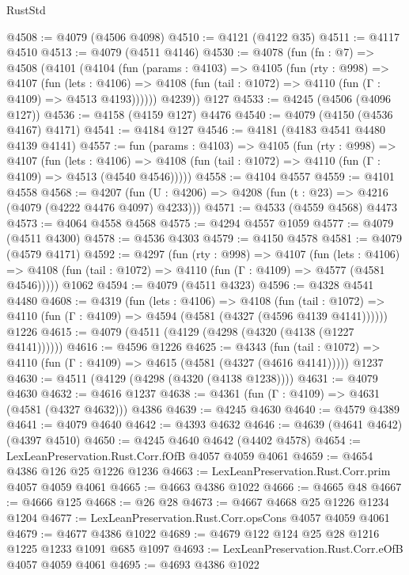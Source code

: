 \begin{lexlean}{RustStd}
\begin{coremodule}
@4508 := @4079 (@4506 @4098)
@4510 := @4121 (@4122 @35)
@4511 := @4117 @4510
@4513 := @4079 (@4511 @4146)
@4530 := @4078
    (fun (fn : @7) =>
    @4508
      (@4101
        (@4104
          (fun (params : @4103) =>
          @4105
            (fun (rty : @998) =>
            @4107
              (fun (lets : @4106) =>
              @4108 (fun (tail : @1072) => @4110 (fun (Γ : @4109) => @4513 @4193))))))
        @4239))
    @127
@4533 := @4245 (@4506 (@4096 @127))
@4536 := @4158 (@4159 @127) @4476
@4540 := @4079 (@4150 (@4536 @4167) @4171)
@4541 := @4184 @127
@4546 := @4181 (@4183 @4541 @4480 @4139 @4141)
@4557 := fun (params : @4103) =>
  @4105
    (fun (rty : @998) =>
    @4107
      (fun (lets : @4106) =>
      @4108 (fun (tail : @1072) => @4110 (fun (Γ : @4109) => @4513 (@4540 @4546)))))
@4558 := @4104 @4557
@4559 := @4101 @4558
@4568 := @4207 (fun (U : @4206) => @4208 (fun (t : @23) => @4216 (@4079 (@4222 @4476 @4097) @4233)))
@4571 := @4533 (@4559 @4568) @4473
@4573 := @4064 @4558 @4568
@4575 := @4294 @4557 @1059
@4577 := @4079 (@4511 @4300)
@4578 := @4536 @4303
@4579 := @4150 @4578
@4581 := @4079 (@4579 @4171)
@4592 := @4297
    (fun (rty : @998) =>
    @4107
      (fun (lets : @4106) =>
      @4108 (fun (tail : @1072) => @4110 (fun (Γ : @4109) => @4577 (@4581 @4546)))))
    @1062
@4594 := @4079 (@4511 @4323)
@4596 := @4328 @4541 @4480
@4608 := @4319
    (fun (lets : @4106) =>
    @4108
      (fun (tail : @1072) => @4110 (fun (Γ : @4109) => @4594 (@4581 (@4327 (@4596 @4139 @4141))))))
    @1226
@4615 := @4079 (@4511 (@4129 (@4298 (@4320 (@4138 (@1227 @4141))))))
@4616 := @4596 @1226
@4625 := @4343
    (fun (tail : @1072) => @4110 (fun (Γ : @4109) => @4615 (@4581 (@4327 (@4616 @4141)))))
    @1237
@4630 := @4511 (@4129 (@4298 (@4320 (@4138 @1238))))
@4631 := @4079 @4630
@4632 := @4616 @1237
@4638 := @4361 (fun (Γ : @4109) => @4631 (@4581 (@4327 @4632))) @4386
@4639 := @4245 @4630
@4640 := @4579 @4389
@4641 := @4079 @4640
@4642 := @4393 @4632
@4646 := @4639 (@4641 @4642) (@4397 @4510)
@4650 := @4245 @4640 @4642 (@4402 @4578)
@4654 := LexLeanPreservation.Rust.Corr.fOfB @4057 @4059 @4061
@4659 := @4654 @4386 @126 @25 @1226 @1236
@4663 := LexLeanPreservation.Rust.Corr.prim @4057 @4059 @4061
@4665 := @4663 @4386 @1022
@4666 := @4665 @48
@4667 := @4666 @125
@4668 := @26 @28
@4673 := @4667 @4668 @25 @1226 @1234 @1204
@4677 := LexLeanPreservation.Rust.Corr.opsCons @4057 @4059 @4061
@4679 := @4677 @4386 @1022
@4689 := @4679 @122 @124 @25 @28 @1216 @1225 @1233 @1091 @685 @1097
@4693 := LexLeanPreservation.Rust.Corr.eOfB @4057 @4059 @4061
@4695 := @4693 @4386 @1022

\end{coremodule}
\end{lexlean}
